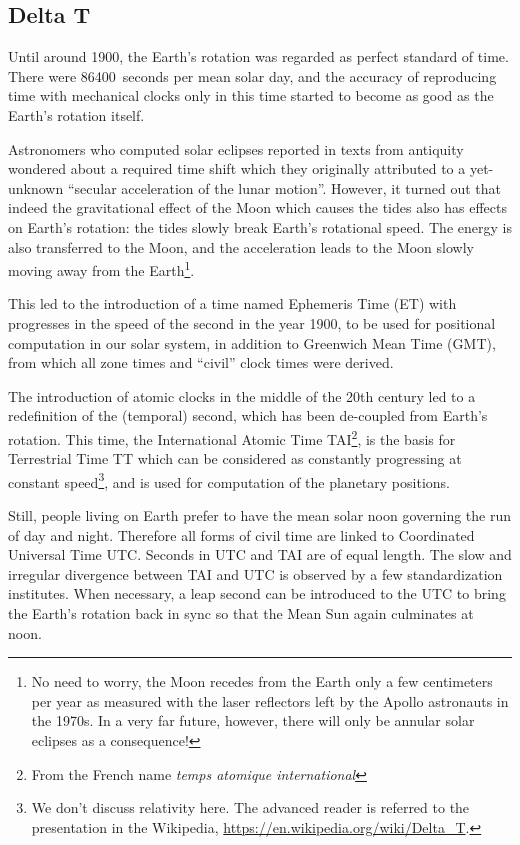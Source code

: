\subsection{Delta T}
\label{sec:Concepts:DeltaT}

Until around 1900, the Earth's rotation was regarded as perfect
standard of time. There were 86400~seconds per mean solar day, and the
accuracy of reproducing time with mechanical clocks only in this time
started to become as good as the Earth's rotation itself.

Astronomers who computed solar eclipses reported in texts from
antiquity wondered about a required time shift which they originally
attributed to a yet-unknown ``secular acceleration of the lunar
motion''. However, it turned out that indeed the gravitational effect
of the Moon which causes the tides also has effects on Earth's
rotation: the tides slowly break Earth's rotational speed. The energy
is also transferred to the Moon, and the acceleration leads to the
Moon slowly moving away from the Earth\footnote{No need to worry, the
  Moon recedes from the Earth only a few centimeters per year as
  measured with the laser reflectors left by the Apollo astronauts in
  the 1970s. In a very far future, however, there will only be annular
  solar eclipses as a consequence!}.

This led to the introduction of a time named Ephemeris Time (ET) with
progresses in the speed of the second in the year 1900, to be used for
positional computation in our solar system, in addition to Greenwich
Mean Time (GMT), from which all zone times and ``civil'' clock times were
derived.

The introduction of atomic clocks in the middle of the 20th century
led to a redefinition of the (temporal) second, which has been
de-coupled from Earth's rotation. This time, the International Atomic
Time TAI\footnote{From the French name \textit{temps atomique international}}, is the basis for Terrestrial Time TT which can be
considered as constantly progressing at constant speed\footnote{We
  don't discuss relativity here. The advanced reader is referred to
  the presentation in the Wikipedia,
  \url{https://en.wikipedia.org/wiki/Delta_T}.}, and is used for
computation of the planetary positions.

Still, people living on Earth prefer to have the mean solar noon
governing the run of day and night. Therefore all forms of civil time
are linked to Coordinated Universal Time UTC. Seconds in UTC and TAI
are of equal length. The slow and irregular divergence between TAI and
UTC is observed by a few standardization institutes.  When necessary,
a leap second can be introduced to the UTC to bring the Earth's
rotation back in sync so that the Mean Sun again culminates at noon.

